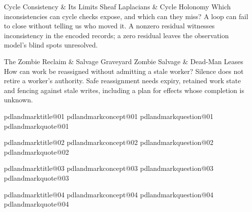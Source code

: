 \expandafter\def\csname pdlandmarktitle@11\endcsname{Cycle Consistency \& Its Limits}
\expandafter\def\csname pdlandmarkconcept@11\endcsname{Sheaf Laplacians \& Cycle Holonomy}
\expandafter\def\csname pdlandmarkquestion@11\endcsname{Which inconsistencies can cycle checks expose, and which can they miss?}
\expandafter\def\csname pdlandmarkquote@11\endcsname{A loop can fail to close without telling us who moved it. A nonzero residual witnesses inconsistency in the encoded records; a zero residual leaves the observation model's blind spots unresolved.}

\expandafter\def\csname pdlandmarktitle@12\endcsname{The Zombie Reclaim \& Salvage Graveyard}
\expandafter\def\csname pdlandmarkconcept@12\endcsname{Zombie Salvage \& Dead-Man Leases}
\expandafter\def\csname pdlandmarkquestion@12\endcsname{How can work be reassigned without admitting a stale worker?}
\expandafter\def\csname pdlandmarkquote@12\endcsname{Silence does not retire a worker's authority. Safe reassignment needs expiry, retained work state and fencing against stale writes, including a plan for effects whose completion is unknown.}

\expandafter\def\csname pdlandmarktitle@1\endcsname{\csname pdlandmarktitle@01\endcsname}
\expandafter\def\csname pdlandmarkconcept@1\endcsname{\csname pdlandmarkconcept@01\endcsname}
\expandafter\def\csname pdlandmarkquestion@1\endcsname{\csname pdlandmarkquestion@01\endcsname}
\expandafter\def\csname pdlandmarkquote@1\endcsname{\csname pdlandmarkquote@01\endcsname}

\expandafter\def\csname pdlandmarktitle@2\endcsname{\csname pdlandmarktitle@02\endcsname}
\expandafter\def\csname pdlandmarkconcept@2\endcsname{\csname pdlandmarkconcept@02\endcsname}
\expandafter\def\csname pdlandmarkquestion@2\endcsname{\csname pdlandmarkquestion@02\endcsname}
\expandafter\def\csname pdlandmarkquote@2\endcsname{\csname pdlandmarkquote@02\endcsname}

\expandafter\def\csname pdlandmarktitle@3\endcsname{\csname pdlandmarktitle@03\endcsname}
\expandafter\def\csname pdlandmarkconcept@3\endcsname{\csname pdlandmarkconcept@03\endcsname}
\expandafter\def\csname pdlandmarkquestion@3\endcsname{\csname pdlandmarkquestion@03\endcsname}
\expandafter\def\csname pdlandmarkquote@3\endcsname{\csname pdlandmarkquote@03\endcsname}

\expandafter\def\csname pdlandmarktitle@4\endcsname{\csname pdlandmarktitle@04\endcsname}
\expandafter\def\csname pdlandmarkconcept@4\endcsname{\csname pdlandmarkconcept@04\endcsname}
\expandafter\def\csname pdlandmarkquestion@4\endcsname{\csname pdlandmarkquestion@04\endcsname}
\expandafter\def\csname pdlandmarkquote@4\endcsname{\csname pdlandmarkquote@04\endcsname}

